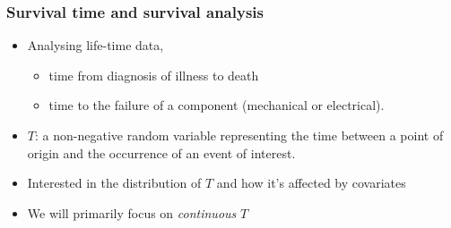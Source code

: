 \documentclass{beamer}
\newenvironment{wideitemize}%
  {\begin{itemize}%
    \setlength{\parskip}{1em}}%
  {\end{itemize}}
\begin{document}
\begin{frame} \frametitle{Survival time and survival analysis}
\begin{wideitemize}
\item
Analysing
life-time data, 
\begin{itemize}
\item time from diagnosis of illness to death

\item  time to
the failure of a component (mechanical or electrical).
\end{itemize}

 

\item
$T$:
a non-negative random variable representing the time between a point of origin and the
occurrence of an event of interest.
\item
Interested in the distribution of $T$ and how it's affected by covariates
\item
We will primarily focus on  \emph{continuous} $T$ 
\end{wideitemize}
\end{frame}
\end{document}

